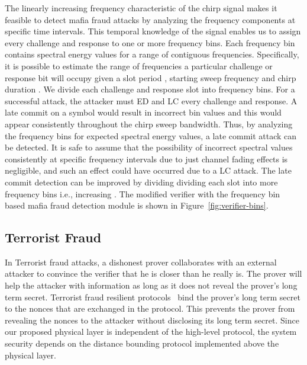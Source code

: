 \documentclass{sig-alternate-10pt}
\newcommand{\ie}{i.e.,\xspace}
\begin{document}
The linearly increasing frequency characteristic of the chirp signal makes it
feasible to detect mafia fraud attacks by analyzing the frequency components at
specific time intervals. This temporal knowledge of the signal enables us to assign
every challenge and response to one or more frequency bins. Each frequency bin
contains spectral energy values for a range of contiguous frequencies. Specifically,
it is possible to estimate the range of frequencies a particular challenge or
response bit will occupy given a slot period , starting sweep frequency 
and chirp duration . We divide each challenge and response slot into 
frequency bins. For a successful attack, the attacker must ED and LC every challenge
and response. A late commit on a symbol would result in incorrect bin values and
this would appear consistently throughout the chirp sweep bandwidth. Thus, by
analyzing the frequency bins for expected spectral energy values, a late commit
attack can be detected. It is safe to assume that the possibility of incorrect
spectral values consistently at specific frequency intervals due to just channel
fading effects is negligible, and such an effect could have occurred due to a LC
attack. The late commit detection can be improved by dividing dividing each slot
into more frequency bins \ie increasing . The modified verifier with the
frequency bin based mafia fraud detection module is shown in
Figure~\ref{fig:verifier-bins}.

\subsection{Terrorist Fraud}
\label{subsec:terrorist-fraud}

In Terrorist fraud attacks, a dishonest prover collaborates with an external
attacker to convince the verifier that he is closer than he really is. The
prover will help the attacker with information as long as it does not reveal
the prover's long term secret. Terrorist fraud resilient
protocols~\cite{TuSep07,KimDec08,ReidMar07} bind the prover's long term secret
to the nonces that are exchanged in the protocol. This prevents the prover
from revealing the nonces to the attacker without disclosing its long term
secret. Since our proposed physical layer is independent of the high-level
protocol, the system security depends on the distance bounding protocol
implemented above the physical layer.
\end{document}
